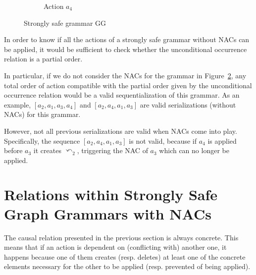 \begin{example}
\begin{figure}[!ht]
\begin{subfigure}[t]{.2\textwidth}
    \caption{Action $a_4$}\label{fig:process:unconditional-relation:a4}
  \end{subfigure}
  \caption{Strongly safe grammar GG}\label{fig:process:unconditional-relation}
\end{figure}

  In order to know if all the actions of a strongly safe grammar without NACs can be applied, it would be sufficient to check whether the unconditional occurrence relation is a partial order.

  In particular, if we do not consider the NACs for the grammar in Figure~\ref{fig:process:unconditional-relation}, any total order of action compatible with the partial order given by the unconditional occurrence relation would be a valid sequentialization of this grammar. As an example, $[a_2, a_1, a_3, a_4]$ and $[a_2, a_4, a_1, a_3]$ are valid serializations (without NACs) for this grammar. 
  
  However, not all previous serializations are valid when NACs come into play. Specifically, the sequence $[a_2, a_4, a_1, a_3]$ is not valid, because if $a_4$ is applied before $a_3$ it creates $\curvearrowleft_2$, triggering the NAC of $a_3$ which can no longer be applied. 

\end{example}

\section{Relations within Strongly Safe Graph Grammars with NACs}

The causal relation presented in the previous section is always concrete. This means that if an action is dependent on (conflicting with) another one, it happens because one of them creates (resp. deletes) at least one of the concrete elements necessary for the other to be applied (resp. prevented of being applied).

